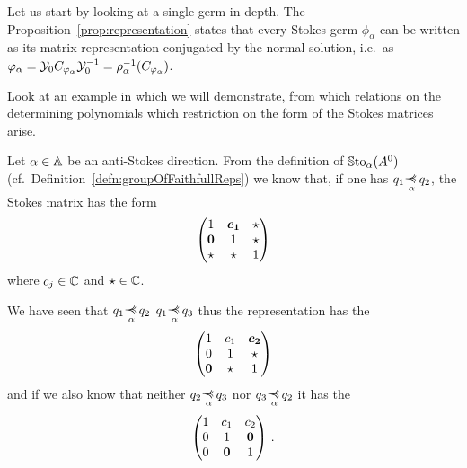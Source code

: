 Let us start by looking at a single germ in depth.
The Proposition~\ref{prop:representation} states that every Stokes germ
$\phi_\alpha$ can be written as its matrix representation conjugated by the
normal solution, i.e.\ as $\varphi_\alpha=\mathcal{Y}_{0}C_{\varphi_\alpha}\mathcal{Y}_{0}^{-1}
=\rho_{\alpha}^{-1}(C_{\varphi_\alpha})$.

Look at an example in which we will demonstrate, from which relations on the
determining polynomials which restriction on the form of the Stokes matrices
arise.
\begin{exmp}
  Let $\alpha\in\mathbb{A}$ be an anti-Stokes direction.
  From the definition of $\operatorname{\mathbb{S}to}_\alpha(A^0)$ (cf.\
  Definition~\ref{defn:groupOfFaithfullReps}) we know that, if one has
  $q_1\myrel{\alpha}q_2$, the Stokes matrix has the form
  \[
    \begin{pmatrix}
      1 & \text{\boldmath$c_1$} & \star
    \\\text{\boldmath$0$} & 1 & \star
    \\\star & \star & 1
    \end{pmatrix}
  \]
  where $c_j\in\mathbb{C}$ and $\star\in\mathbb{C}$.

  We have seen that $q_1\myrel{\alpha}q_2$ \Rightarrow{}
  $q_1\myrel{\alpha}q_3$ thus the representation has the
  \[
    \begin{pmatrix}
      1 & c_1 & \text{\boldmath$c_2$}
    \\0 & 1 & \star
    \\\text{\boldmath$0$} & \star & 1
    \end{pmatrix}
  \]
  and if we also know that neither $q_2\myrel{\alpha}q_3$ nor
  $q_3\myrel{\alpha}q_2$ it has the 
  \[
    \begin{pmatrix}
      1 & c_1 & c_2
    \\0 & 1 & \text{\boldmath$0$}
    \\0 & \text{\boldmath$0$} & 1
    \end{pmatrix}\,.
  \]
  \begin{comment}
    We also know that every matrix of this \rewrite{form} is a representation
    to some Stokes germ.
    Thus we have an isomorphism
    \begin{align*}
      \vartheta_\alpha:\C^2 &\longrightarrow \SSto_\alpha(A^0)
    \\(c_1,c_2)&\longmapsto
      \begin{pmatrix}
        1 & c_1 & c_2
      \\0 & 1 & 0
      \\0 & 0 & 1
      \end{pmatrix}
    \end{align*}
  \end{comment}
\end{exmp}
